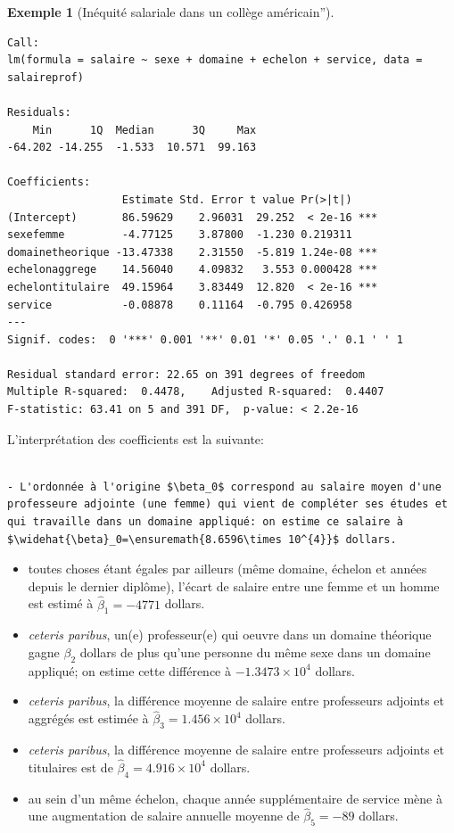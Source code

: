 \documentclass[
  11pt,
  letterpaper,
]{scrbook}
\providecommand{\tightlist}{%
  \setlength{\itemsep}{0pt}\setlength{\parskip}{0pt}}\usepackage{longtable,booktabs,array}
\theoremstyle{definition}
\newtheorem{example}{Exemple}[chapter]
\theoremstyle{remark}
\begin{document}
\begin{example}[Inéquité salariale dans un collège
américain'']
\begin{verbatim}
Call:
lm(formula = salaire ~ sexe + domaine + echelon + service, data = salaireprof)

Residuals:
    Min      1Q  Median      3Q     Max 
-64.202 -14.255  -1.533  10.571  99.163 

Coefficients:
                  Estimate Std. Error t value Pr(>|t|)    
(Intercept)       86.59629    2.96031  29.252  < 2e-16 ***
sexefemme         -4.77125    3.87800  -1.230 0.219311    
domainetheorique -13.47338    2.31550  -5.819 1.24e-08 ***
echelonaggrege    14.56040    4.09832   3.553 0.000428 ***
echelontitulaire  49.15964    3.83449  12.820  < 2e-16 ***
service           -0.08878    0.11164  -0.795 0.426958    
---
Signif. codes:  0 '***' 0.001 '**' 0.01 '*' 0.05 '.' 0.1 ' ' 1

Residual standard error: 22.65 on 391 degrees of freedom
Multiple R-squared:  0.4478,    Adjusted R-squared:  0.4407 
F-statistic: 63.41 on 5 and 391 DF,  p-value: < 2.2e-16
\end{verbatim}

L'interprétation des coefficients est la suivante:

\begin{verbatim}
                                                                                    - L'ordonnée à l'origine $\beta_0$ correspond au salaire moyen d'une professeure adjointe (une femme) qui vient de compléter ses études et qui travaille dans un domaine appliqué: on estime ce salaire à $\widehat{\beta}_0=\ensuremath{8.6596\times 10^{4}}$ dollars.
\end{verbatim}

\begin{itemize}
\tightlist
\item
  toutes choses étant égales par ailleurs (même domaine, échelon et
  années depuis le dernier diplôme), l'écart de salaire entre une femme
  et un homme est estimé à \(\widehat{\beta}_1=-4771\) dollars.
\item
  \emph{ceteris paribus}, un(e) professeur(e) qui oeuvre dans un domaine
  théorique gagne \(\beta_2\) dollars de plus qu'une personne du même
  sexe dans un domaine appliqué; on estime cette différence à
  \(\ensuremath{-1.3473\times 10^{4}}\) dollars.
\item
  \emph{ceteris paribus}, la différence moyenne de salaire entre
  professeurs adjoints et aggrégés est estimée à
  \(\widehat{\beta}_3=\ensuremath{1.456\times 10^{4}}\) dollars.
\item
  \emph{ceteris paribus}, la différence moyenne de salaire entre
  professeurs adjoints et titulaires est de
  \(\widehat{\beta}_4=\ensuremath{4.916\times 10^{4}}\) dollars.
\item
  au sein d'un même échelon, chaque année supplémentaire de service mène
  à une augmentation de salaire annuelle moyenne de
  \(\widehat{\beta}_5=-89\) dollars.
\end{itemize}


\end{example}
\end{document}
